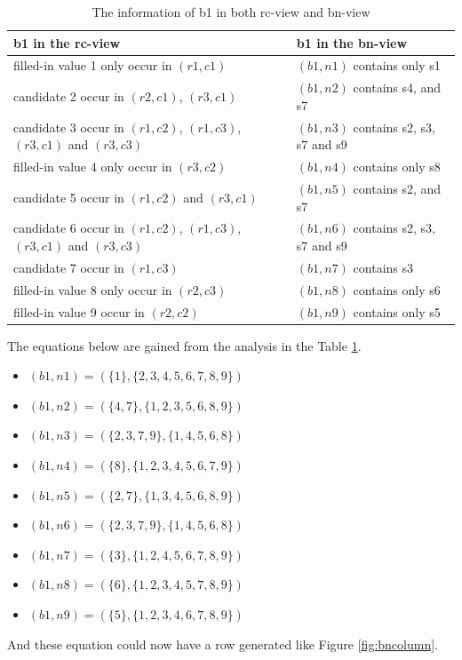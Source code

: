\documentclass[11pt]{report}
\newcommand{\set}[1]{\{ #1 \}}
\begin{document}
\begin{table}
\begin{center}
  \begin{tabular}{|p{7cm}|p{7cm}|}
    \hline
    \textbf{b1 in the rc-view} & \textbf{b1 in the bn-view} \\ \hline
    filled-in value 1 only occur in $(r1,c1)$ & $(b1,n1)$ contains only s1\\ \hline
    candidate 2 occur in $(r2,c1)$, $(r3,c1)$ & $(b1,n2)$ contains s4, and s7 \\ \hline
    candidate 3 occur in $(r1,c2)$,  $(r1,c3)$, $(r3,c1)$ and $(r3,c3)$ & $(b1,n3)$ contains s2, s3, s7 and s9 \\ \hline
    filled-in value 4 only occur in $(r3,c2)$ & $(b1,n4)$ contains only s8 \\ \hline
    candidate 5 occur in $(r1,c2)$ and $(r3,c1)$ & $(b1,n5)$ contains s2, and s7 \\ \hline
    candidate 6 occur in $(r1,c2)$,  $(r1,c3)$, $(r3,c1)$ and $(r3,c3)$ & $(b1,n6)$ contains s2, s3, s7 and s9 \\ \hline
    candidate 7 occur in $(r1,c3)$& $(b1,n7)$ contains s3\\ \hline
    filled-in value 8 only occur in $(r2,c3)$ & $(b1,n8)$ contains only s6 \\ \hline
    filled-in value 9 occur in $(r2,c2)$ & $(b1,n9)$ contains only s5 \\ \hline
  \end{tabular}
\caption{The information of b1 in both rc-view and bn-view}
\label{tab:rcandbn}
\end{center}
\end{table}

The equations below are gained from the analysis in the Table \ref{tab:rcandbn}. 
\begin{itemize}
\item $(b1,n1)=(\set{1}, \set{2, 3, 4, 5, 6, 7, 8, 9})$
\item $(b1,n2)=(\set{4, 7}, \set{1, 2, 3, 5, 6, 8, 9})$
\item $(b1,n3)=(\set{2, 3, 7, 9}, \set{1, 4, 5, 6, 8})$
\item $(b1,n4)=(\set{8}, \set{1, 2, 3, 4, 5, 6, 7, 9})$
\item $(b1,n5)=(\set{2, 7}, \set{1, 3, 4, 5, 6, 8, 9})$
\item $(b1,n6)=(\set{2, 3, 7, 9}, \set{1, 4, 5, 6, 8})$
\item $(b1,n7)=(\set{3}, \set{1, 2, 4, 5, 6, 7, 8, 9})$
\item $(b1,n8)=(\set{6}, \set{1, 2, 3, 4, 5, 7, 8, 9})$
\item $(b1,n9)=(\set{5}, \set{1, 2, 3, 4, 6, 7, 8, 9})$
\end{itemize}
And these equation could now have a row generated like Figure \ref{fig:bncolumn}.
\end{document}
